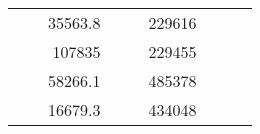 \begin{table}[H]
\begin{tabular}{|ccrccrccc}
\multicolumn{1}{|c|}{\cellcolor[HTML]{FFFFC7}}                                & \multicolumn{1}{c|}{\cellcolor[HTML]{DAE8FC}}                      & \multicolumn{1}{r|}{\cellcolor[HTML]{DAE8FC}35563.8}   & \multicolumn{1}{c|}{\cellcolor[HTML]{FFFFC7}}                                & \multicolumn{1}{c|}{\cellcolor[HTML]{DAE8FC}}                       & \multicolumn{1}{r|}{\cellcolor[HTML]{DDFDFF}229616}    &                                                                              &                                                                    &                                                        \\ \cline{3-3} \cline{6-6}
\multicolumn{1}{|c|}{\cellcolor[HTML]{FFFFC7}}                                & \multicolumn{1}{c|}{\cellcolor[HTML]{DAE8FC}}                      & \multicolumn{1}{r|}{\cellcolor[HTML]{DDFDFF}107835}    & \multicolumn{1}{c|}{\cellcolor[HTML]{FFFFC7}}                                & \multicolumn{1}{c|}{\cellcolor[HTML]{DAE8FC}}                       & \multicolumn{1}{r|}{\cellcolor[HTML]{DAE8FC}229455}    &                                                                              &                                                                    &                                                        \\ \cline{3-3} \cline{6-6}
\multicolumn{1}{|c|}{\cellcolor[HTML]{FFFFC7}}                                & \multicolumn{1}{c|}{\cellcolor[HTML]{DAE8FC}}                      & \multicolumn{1}{r|}{\cellcolor[HTML]{DAE8FC}58266.1}   & \multicolumn{1}{c|}{\cellcolor[HTML]{FFFFC7}}                                & \multicolumn{1}{c|}{\cellcolor[HTML]{DAE8FC}}                       & \multicolumn{1}{r|}{\cellcolor[HTML]{DDFDFF}485378}    &                                                                              &                                                                    &                                                        \\ \cline{3-3} \cline{6-6}
\multicolumn{1}{|c|}{\cellcolor[HTML]{FFFFC7}}                                & \multicolumn{1}{c|}{\cellcolor[HTML]{DAE8FC}}                      & \multicolumn{1}{r|}{\cellcolor[HTML]{DDFDFF}16679.3}   & \multicolumn{1}{c|}{\cellcolor[HTML]{FFFFC7}}                                & \multicolumn{1}{c|}{\cellcolor[HTML]{DAE8FC}}                       & \multicolumn{1}{r|}{\cellcolor[HTML]{DAE8FC}434048}    &                                                                              &                                                                    &                                                        \\ \cline{3-3} \cline{6-6}

\end{tabular}
\end{table}

